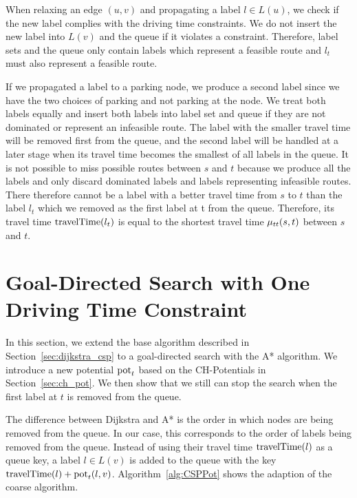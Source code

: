 When relaxing an edge $(u,v)$ and propagating a label $l \in L(u)$, we check if the new label complies with the driving time constraints. We do not insert the new label into $L(v)$ and the queue if it violates a constraint. Therefore, label sets and the queue only contain labels which represent a feasible route and $l_t$ must also represent a feasible route.

If we propagated a label to a parking node, we produce a second label since we have the two choices of parking and not parking at the node. We treat both labels equally and insert both labels into label set and queue if they are not dominated or represent an infeasible route. The label with the smaller travel time will be removed first from the queue, and the second label will be handled at a later stage when its travel time becomes the smallest of all labels in the queue. It is not possible to miss possible routes between $s$ and $t$ because we produce all the labels and only discard dominated labels and labels representing infeasible routes. There therefore cannot be a label with a better travel time from $s$ to $t$ than the label $l_t$ which we removed as the first label at t from the queue. Therefore, its travel time $\operatorname{travelTime}(l_t)$ is equal to the shortest travel time $\mu_{tt}(s,t)$ between $s$ and $t$.

\section{Goal-Directed Search with One Driving Time Constraint}
In this section, we extend the base algorithm described in Section~\ref{sec:dijkstra_csp} to a goal-directed search with the A* algorithm. We introduce a new potential $\operatorname{pot}_t$ based on the CH-Potentials in Section~\ref{sec:ch_pot}. We then show that we still can stop the search when the first label at $t$ is removed from the queue.

The difference between Dijkstra and A* is the order in which nodes are being removed from the queue. In our case, this corresponds to the order of labels being removed from the queue. Instead of using their travel time $\operatorname{travelTime}(l)$ as a queue key, a label $l \in L(v)$ is added to the queue with the key $\operatorname{travelTime}(l) + \operatorname{pot}_t(l,v)$. Algorithm~\ref{alg:CSPPot} shows the adaption of the coarse algorithm.

